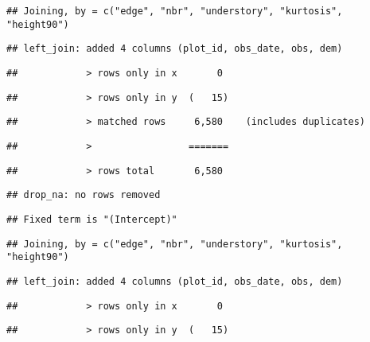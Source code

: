 \documentclass[
]{article}
\begin{document}
\begin{verbatim}
## Joining, by = c("edge", "nbr", "understory", "kurtosis", "height90")
\end{verbatim}

\begin{verbatim}
## left_join: added 4 columns (plot_id, obs_date, obs, dem)
\end{verbatim}

\begin{verbatim}
##            > rows only in x       0
\end{verbatim}

\begin{verbatim}
##            > rows only in y  (   15)
\end{verbatim}

\begin{verbatim}
##            > matched rows     6,580    (includes duplicates)
\end{verbatim}

\begin{verbatim}
##            >                 =======
\end{verbatim}

\begin{verbatim}
##            > rows total       6,580
\end{verbatim}

\begin{verbatim}
## drop_na: no rows removed
\end{verbatim}

\begin{verbatim}
## Fixed term is "(Intercept)"
\end{verbatim}

\begin{verbatim}
## Joining, by = c("edge", "nbr", "understory", "kurtosis", "height90")
\end{verbatim}

\begin{verbatim}
## left_join: added 4 columns (plot_id, obs_date, obs, dem)
\end{verbatim}

\begin{verbatim}
##            > rows only in x       0
\end{verbatim}

\begin{verbatim}
##            > rows only in y  (   15)
\end{verbatim}
\end{document}
